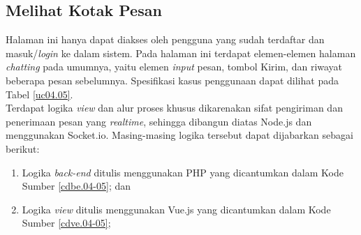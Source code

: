 \newpage
\subsection{Melihat Kotak Pesan}
Halaman ini hanya dapat diakses oleh pengguna yang sudah terdaftar dan masuk/\textit{login} ke dalam sistem. Pada halaman ini terdapat elemen-elemen halaman \textit{chatting} pada umumnya, yaitu elemen \textit{input} pesan, tombol Kirim, dan riwayat beberapa pesan sebelumnya. Spesifikasi kasus penggunaan dapat dilihat pada Tabel \ref{uc04.05}.\\
\indent Terdapat logika \textit{view} dan alur proses khusus dikarenakan sifat pengiriman dan penerimaan pesan yang \textit{realtime}, sehingga dibangun diatas Node.js dan menggunakan Socket.io. Masing-masing logika tersebut dapat dijabarkan sebagai berikut:
\begin{enumerate}
	\item Logika \textit{back-end} ditulis menggunakan PHP yang dicantumkan dalam Kode Sumber \ref{cdbe.04-05}; dan
	\item Logika \textit{view} ditulis menggunakan Vue.js yang dicantumkan dalam Kode Sumber \ref{cdve.04-05};
\end{enumerate}

